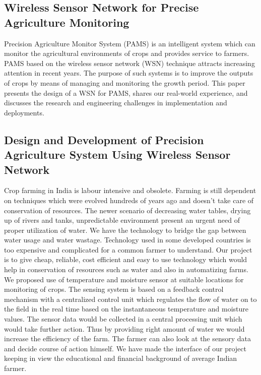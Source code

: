 \documentclass[10pt,a4paper]{article}
\begin{document}
\subsection{Wireless Sensor Network for Precise Agriculture Monitoring}

\quad
Precision Agriculture Monitor System (PAMS) is an intelligent system which can monitor the agricultural environments of crops and provides service to farmers. PAMS based on the wireless sensor network (WSN) technique attracts increasing attention in recent years. The purpose of such systems is to improve the outputs of crops by means of managing and monitoring the growth period. This paper presents the design of a WSN for PAMS, shares our real-world experience, and discusses the research and engineering challenges in implementation and deployments. \cite{2}

\subsection{Design and Development of Precision Agriculture System Using Wireless Sensor Network}

\quad
Crop farming in India is labour intensive and obsolete. Farming is still dependent on techniques which were evolved hundreds of years ago and doesn't take care of conservation of resources. The newer scenario of decreasing water tables, drying up of rivers and tanks, unpredictable environment present an urgent need of proper utilization of water. We have the technology to bridge the gap between water usage and water wastage. Technology used in some developed countries is too expensive and complicated for a common farmer to understand. Our project is to give cheap, reliable, cost efficient and easy to use technology which would help in conservation of resources such as water and also in automatizing farms. We proposed use of temperature and moisture sensor at suitable locations for monitoring of crops. The sensing system is based on a feedback control mechanism with a centralized control unit which regulates the flow of water on to the field in the real time based on the instantaneous temperature and moisture values. The sensor data would be collected in a central processing unit which would take further action. Thus by providing right amount of water we would increase the efficiency of the farm. The farmer can also look at the sensory data and decide course of action himself. We have made the interface of our project keeping in view the educational and financial background of average Indian farmer. \cite{3}
\end{document}
